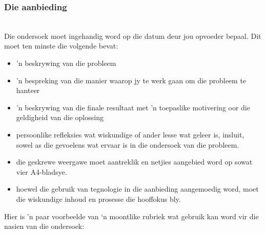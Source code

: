 \subsubsection{Die aanbieding}\\
Die ondersoek moet ingehandig word op die datum deur jou opvoeder bepaal. Dit moet ten minste die volgende bevat:
\begin{itemize}[noitemsep]
\item
  'n beskrywing van die probleem
\item
  'n bespreking van die manier waarop jy te werk gaan om die probleem te hanteer
\item
  'n beskrywing van die finale resultaat met 'n toepaslike motivering oor die geldigheid van die oplossing
\item
   persoonlike refleksies wat wiskundige of ander lesse wat geleer is, insluit, sowel as die gevoelens wat ervaar is in die ondersoek van die probleem.
\item
  die geskrewe weergawe moet aantreklik en netjies aangebied word op sowat vier A4-bladsye.
\item
  hoewel die gebruik van tegnologie in die aanbieding aangemoedig word, moet die wiskundige inhoud en prosesse die hooffokus bly.
\end{itemize}	
Hier is 'n paar voorbeelde van ‘n moontlike rubriek wat gebruik kan word vir die nasien van die ondersoek:


